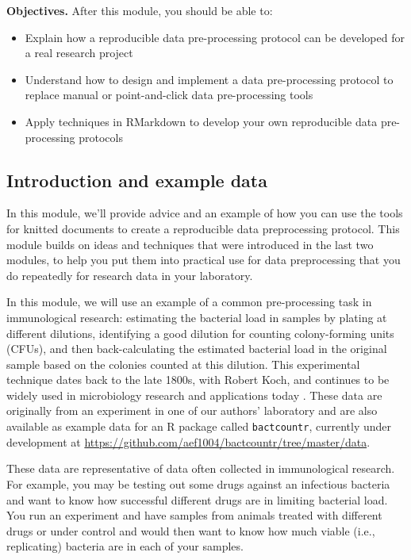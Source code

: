 \documentclass[]{tufte-book}
\providecommand{\tightlist}{%
  \setlength{\itemsep}{0pt}\setlength{\parskip}{0pt}}
\begin{document}
\textbf{Objectives.} After this module, you should be able to:

\begin{itemize}
\tightlist
\item
  Explain how a reproducible data pre-processing protocol can be developed for
  a real research project
\item
  Understand how to design and implement a data pre-processing protocol to
  replace manual or point-and-click data pre-processing tools
\item
  Apply techniques in RMarkdown to develop your own reproducible data
  pre-processing protocols
\end{itemize}

\hypertarget{introduction-and-example-data}{%
\subsection{Introduction and example data}\label{introduction-and-example-data}}

In this module, we'll provide advice and an example of how you can use the
tools for knitted documents to create a reproducible data preprocessing
protocol. This module builds on ideas and techniques that were introduced
in the last two modules, to help you put them into practical use for
data preprocessing that you do repeatedly for research data in your
laboratory.

In this module, we will use an example of a common pre-processing task in
immunological research: estimating the bacterial load in samples by plating at
different dilutions, identifying a good dilution for counting colony-forming
units (CFUs), and then back-calculating the estimated bacterial load in the
original sample based on the colonies counted at this dilution. This
experimental technique dates back to the late 1800s, with Robert Koch, and
continues to be widely used in microbiology research and applications today
\citep{ben2014estimation}. These data are originally from an experiment in one of our
authors' laboratory and are also available as example data for an R package
called \texttt{bactcountr}, currently under development at
\url{https://github.com/aef1004/bactcountr/tree/master/data}.

These data are representative of data often collected in immunological research.
For example, you may be testing out some drugs against an infectious bacteria
and want to know how successful different drugs are in limiting bacterial load.
You run an experiment and have samples from animals treated with different drugs
or under control and would then want to know how much viable (i.e., replicating)
bacteria are in each of your samples.
\end{document}
